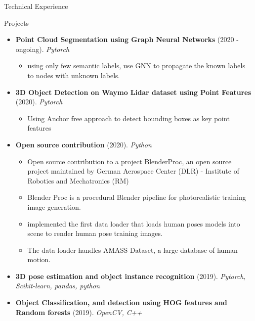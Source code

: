 \documentclass[]{mcdowellcv}
\begin{document}
	\begin{cvsection}{Technical Experience}
		\begin{cvsubsection}{Projects}{}{}
			\begin{itemize}
				\item \textbf{Point Cloud Segmentation using Graph Neural Networks} (2020 - ongoing). \textit{Pytorch}
					\begin{itemize}
						\item using only few semantic labels, use GNN to propagate the known labels to nodes with unknown labels.
					\end{itemize}
				\item \textbf{3D Object Detection on Waymo Lidar dataset using Point Features} (2020). \textit{Pytorch}
					\begin{itemize}
						\item Using Anchor free approach to detect bounding boxes as key point features
					\end{itemize}
				\item \textbf{Open source contribution} (2020). \textit{Python}
				\begin{itemize}
					\item Open source contribution to a project BlenderProc, an open source project maintained by German Aerospace Center (DLR) - Institute of Robotics and Mechatronics (RM)
					\item Blender Proc is a procedural Blender pipeline for photorealistic training image generation.
					\item implemented the first data loader that loads human poses models into scene to render human pose training images.
					\item The data loader handles AMASS Dataset, a large database of human motion. 
				\end{itemize}
				\item \textbf{3D pose estimation and object instance recognition} (2019). \textit{Pytorch, Scikit-learn, pandas, python}
				\item \textbf{Object Classification, and detection using HOG features and Random forests} (2019). \textit{OpenCV, C++}
			\end{itemize}
		\end{cvsubsection}		
	\end{cvsection}
	
\end{document}
